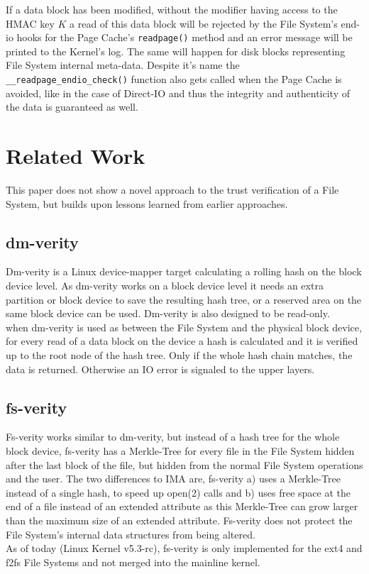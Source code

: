 \documentclass[10pt]{article}
\begin{document}
If a data block has been modified, without the modifier having access to the
HMAC key $K$ a read of this data block will be rejected by the File System's
end-io hooks for the Page Cache's \texttt{readpage()} method and an error
message will be printed to the Kernel's log. The same will happen for disk
blocks representing File System internal meta-data. Despite it's name the
\texttt{\_\_readpage\_endio\_check()} function also gets called when the Page
Cache is avoided, like in the case of Direct-IO and thus the integrity and
authenticity of the data is guaranteed as well.

\section{Related Work}
This paper does not show a novel approach to the trust verification of a 
File System, but builds upon lessons learned from earlier approaches.

\subsection{dm-verity}
Dm-verity is a Linux device-mapper target calculating a rolling hash on the
block device level. As dm-verity works on a block device level it needs an
extra partition or block device to save the resulting hash tree, or a reserved
area on the same block device can be used. Dm-verity is also designed to be
read-only.\\
when dm-verity is used as between the File System and the physical block
device, for every read of a data block on the device a hash is calculated and
it is verified up to the root node of the hash tree. Only if the whole hash
chain matches, the data is returned. Otherwise an IO error is signaled to the
upper layers.

\subsection{fs-verity}
Fs-verity\cite{FS-VERITY} works similar to dm-verity, but instead of a hash
tree for the whole block device, fs-verity has a Merkle-Tree for every file in
the File System hidden after the last block of the file, but hidden from the
normal File System operations and the user. The two differences to IMA are,
fs-verity a) uses a Merkle-Tree instead of a single hash, to speed up open(2)
calls and b) uses free space at the end of a file instead of an extended
attribute as this Merkle-Tree can grow larger than the maximum size of an
extended attribute. Fs-verity does not protect the File System's internal data
structures from being altered.\\
As of today (Linux Kernel v5.3-rc), fs-verity is only implemented for the ext4
and f2fs File Systems and not merged into the mainline kernel.
\end{document}
